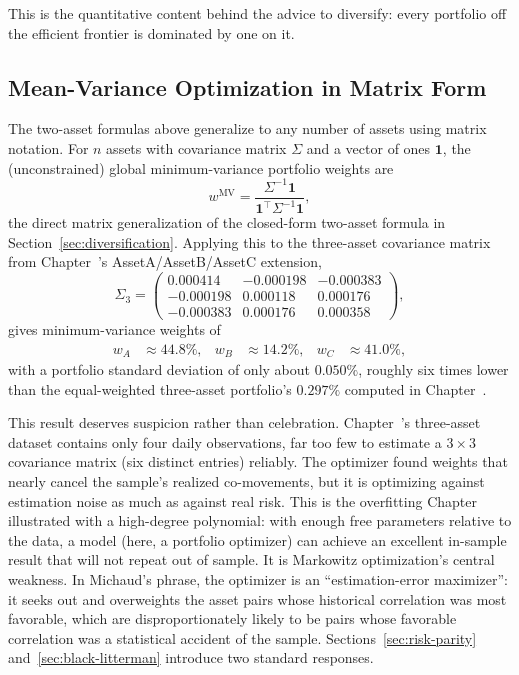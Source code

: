 \documentclass[../ai_in_finance]{subfiles}
\begin{document}
This is the quantitative content behind the advice to diversify: every portfolio off the efficient frontier is dominated by one on it.

\subsection{Mean-Variance Optimization in Matrix Form}
\label{sec:matrix-optimization}

The two-asset formulas above generalize to any number of assets using matrix notation. For $n$ assets with covariance matrix $\Sigma$ and a vector of ones $\mathbf{1}$, the (unconstrained) global minimum-variance portfolio weights are
\begin{equation}
w^{\text{MV}} = \frac{\Sigma^{-1}\mathbf{1}}{\mathbf{1}^\top \Sigma^{-1}\mathbf{1}},
\label{eq:portfolio-min-variance}
\end{equation}
the direct matrix generalization of the closed-form two-asset formula in Section~\ref{sec:diversification}. Applying this to the three-asset covariance matrix from Chapter~'s AssetA/AssetB/AssetC extension,
\begin{equation*}
\Sigma_3 = \begin{pmatrix} 0.000414 & -0.000198 & -0.000383 \\ -0.000198 & 0.000118 & 0.000176 \\ -0.000383 & 0.000176 & 0.000358 \end{pmatrix},
\end{equation*}
gives minimum-variance weights of
\begin{align*}
w_A &\approx 44.8\%, & w_B &\approx 14.2\%, & w_C &\approx 41.0\%,
\end{align*}
with a portfolio standard deviation of only about $0.050\%$, roughly six times lower than the equal-weighted three-asset portfolio's $0.297\%$ computed in Chapter~.

This result deserves suspicion rather than celebration.
Chapter~'s three-asset dataset contains only four daily observations, far too few to estimate a $3\times 3$ covariance matrix (six distinct entries) reliably. The optimizer found weights that nearly cancel the sample's realized co-movements, but it is optimizing against estimation noise as much as against real risk. This is the overfitting Chapter~ illustrated with a high-degree polynomial: with enough free parameters relative to the data, a model (here, a portfolio optimizer) can achieve an excellent in-sample result that will not repeat out of sample.
It is Markowitz optimization's central weakness. In Michaud's phrase, the optimizer is an ``estimation-error maximizer'': it seeks out and overweights the asset pairs whose historical correlation was most favorable, which are disproportionately likely to be pairs whose favorable correlation was a statistical accident of the sample.
Sections~\ref{sec:risk-parity} and~\ref{sec:black-litterman} introduce two standard responses.
\end{document}

